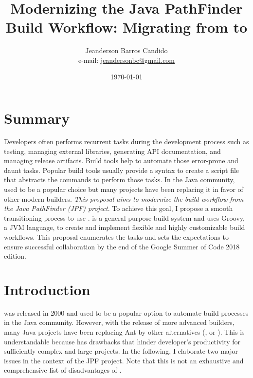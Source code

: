 \documentclass{article}
\author{Jeanderson Barros Candido\\e-mail: \url{jeandersonbc@gmail.com}}
\title{Modernizing the Java PathFinder Build Workflow: Migrating from \ant{} to
\gradle{}}
\date{\today}
\begin{document}
\maketitle

\section*{Summary}

\noindent
Developers often performs recurrent tasks during the development process such
as testing, managing external libraries, generating API documentation, and
managing release artifacts.
Build tools help to automate those error-prone and daunt tasks.
Popular build tools usually provide a syntax to create a script file that
abstracts the commands to perform those tasks.
In the Java community, \ant{} used to be a popular choice but many
projects have been replacing it in favor of other modern builders.
\emph{This proposal aims to modernize the build workflow from the Java
PathFinder (JPF) project}.
To achieve this goal, I propose a smooth transitioning process to use
\gradle{}.
\gradle{} is a general purpose build system and uses Groovy, a JVM language, to
create and implement flexible and highly customizable build workflows.
This proposal enumerates the tasks and sets the expectations to ensure
successful collaboration by the end of the Google Summer of Code 2018 edition.

\section{Introduction}
\label{sec:intro}

\ant{}\cite{page:ant} was released in 2000 and used to be a popular option to
automate build processes in the Java community.
However, with the release of more advanced builders, many Java projects have
been replacing Ant by other alternatives (\eg, \gradle{}\cite{page:gradle} or
\maven{}\cite{page:maven}).
This is understandable because \ant{} has drawbacks that hinder developer's
productivity for sufficiently complex and large projects.
In the following, I elaborate two major issues in the context of the JPF
project.
Note that this is not an exhaustive and comprehensive list of disadvantages of
\ant{}.
\end{document}
